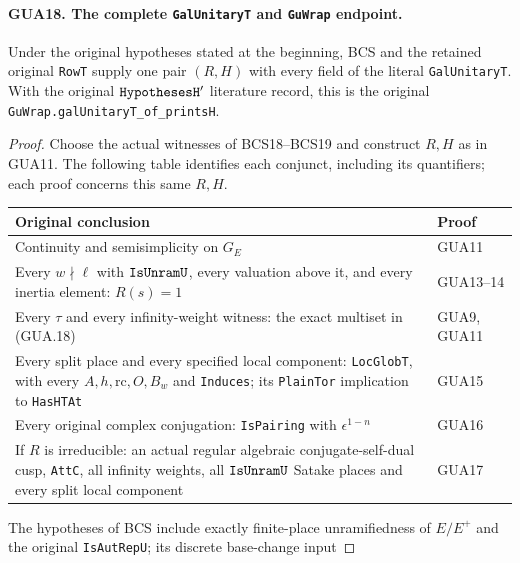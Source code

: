\documentclass[11pt,a4paper]{article}
\numberwithin{equation}{section}
\theoremstyle{remark}\newtheorem{remark}[theorem]{Remark}
\begin{document}
\paragraph{GUA18. The complete \texttt{Gal\allowbreak Unitary\allowbreak T} and \texttt{Gu\allowbreak Wrap} endpoint.}
\label{claim:GUA18}
Under the original hypotheses stated at the beginning,
BCS and the retained original \texttt{Row\allowbreak T} supply
one pair $(R,H)$ with every field of the literal
\texttt{Gal\allowbreak Unitary\allowbreak T}.  With the original
$\texttt{Hypotheses\allowbreak H}'$ literature record, this is
the original \texttt{Gu\allowbreak Wrap.\allowbreak gal\allowbreak Unitary\allowbreak T\_\allowbreak of\_\allowbreak prints\allowbreak H}.
\begin{proof}
Choose the actual witnesses of BCS18--BCS19 and construct
$R,H$ as in GUA11.  The following table identifies
each conjunct, including its quantifiers; each
proof concerns this same $R,H$.
\begin{center}
\begin{tabular}{p{.69\linewidth}p{.19\linewidth}}
\hline
Original conclusion & Proof \\
\hline
Continuity and semisimplicity on $G_E$ & GUA11 \\
Every $w\nmid\ell$ with $\texttt{Is\allowbreak Unram\allowbreak U}$,
every valuation above it, and every inertia element:
$R(s)=1$ & GUA13--14 \\
Every $\tau$ and every infinity-weight witness:
the exact multiset in (GUA.18) & GUA9, GUA11 \\
Every split place and every specified local component:
\texttt{Loc\allowbreak Glob\allowbreak T}, with every $A,h,\mathrm{rc},O,B_w$
and \texttt{Induces}; its \texttt{Plain\allowbreak Tor}
implication to \texttt{Has\allowbreak HTAt} & GUA15 \\
Every original complex conjugation:
\texttt{Is\allowbreak Pairing} with $\epsilon^{1-n}$ & GUA16 \\
If $R$ is irreducible: an actual regular algebraic
conjugate-self-dual cusp, \texttt{Att\allowbreak C}, all infinity
weights, all $\texttt{Is\allowbreak Unram\allowbreak U}$ Satake places and
every split local component & GUA17 \\
\hline
\end{tabular}
\end{center}
The hypotheses of BCS include exactly finite-place
unramifiedness of $E/E^+$ and the original
\texttt{Is\allowbreak Aut\allowbreak Rep\allowbreak U}; its discrete base-change input

\end{proof}
\end{document}
